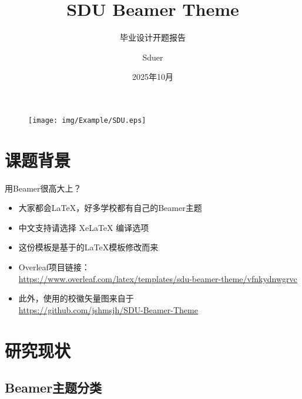 \documentclass[aspectratio=169]{beamer}
\author{Sduer}
\title{SDU Beamer Theme}
\subtitle{毕业设计开题报告}
\institute{山东大学xxx学院}
\date{2025年10月}
\begin{document}
\begin{frame}
    \titlepage
    \begin{figure}[htpb]
        \begin{center}
            \texttt{[image: img/Example/SDU.eps]}
        \end{center}
    \end{figure}
\end{frame}

\begin{frame}
    \tableofcontents[sectionstyle=show,subsectionstyle=show/shaded/hide,subsubsectionstyle=show/shaded/hide]
\end{frame}

\section{课题背景}

\begin{frame}{用Beamer很高大上？}
    \begin{itemize}[<+-| alert@+>] %
        \item 大家都会\LaTeX{}，好多学校都有自己的Beamer主题
        \item 中文支持请选择 Xe\LaTeX{} 编译选项
        \item 这份模板是基于\cite{origin}的\LaTeX{}模板修改而来
        \item Overleaf项目链接：\\
        \tiny\url{https://www.overleaf.com/latex/templates/sdu-beamer-theme/vfnkydnwgrvc}
        \item 此外，使用的校徽矢量图来自于\\\url{https://github.com/jshmsjh/SDU-Beamer-Theme}
    \end{itemize}
\end{frame}

\section{研究现状}

\subsection{Beamer主题分类}
\end{document}

